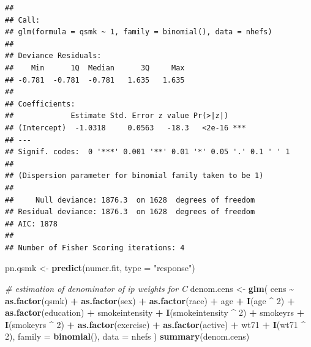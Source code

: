 \documentclass[
  10pt,
]{book}
\newenvironment{Shaded}{\begin{snugshade}}{\end{snugshade}}
\newcommand{\CommentTok}[1]{\textcolor[rgb]{0.56,0.35,0.01}{\textit{#1}}}
\newcommand{\DataTypeTok}[1]{\textcolor[rgb]{0.13,0.29,0.53}{#1}}
\newcommand{\DecValTok}[1]{\textcolor[rgb]{0.00,0.00,0.81}{#1}}
\newcommand{\KeywordTok}[1]{\textcolor[rgb]{0.13,0.29,0.53}{\textbf{#1}}}
\newcommand{\NormalTok}[1]{#1}
\newcommand{\OperatorTok}[1]{\textcolor[rgb]{0.81,0.36,0.00}{\textbf{#1}}}
\newcommand{\StringTok}[1]{\textcolor[rgb]{0.31,0.60,0.02}{#1}}
\begin{document}
\begin{verbatim}
## 
## Call:
## glm(formula = qsmk ~ 1, family = binomial(), data = nhefs)
## 
## Deviance Residuals: 
##    Min      1Q  Median      3Q     Max  
## -0.781  -0.781  -0.781   1.635   1.635  
## 
## Coefficients:
##             Estimate Std. Error z value Pr(>|z|)    
## (Intercept)  -1.0318     0.0563   -18.3   <2e-16 ***
## ---
## Signif. codes:  0 '***' 0.001 '**' 0.01 '*' 0.05 '.' 0.1 ' ' 1
## 
## (Dispersion parameter for binomial family taken to be 1)
## 
##     Null deviance: 1876.3  on 1628  degrees of freedom
## Residual deviance: 1876.3  on 1628  degrees of freedom
## AIC: 1878
## 
## Number of Fisher Scoring iterations: 4
\end{verbatim}

\begin{Shaded}
\begin{Highlighting}[]
\NormalTok{pn.qsmk \textless{}{-}}\StringTok{ }\KeywordTok{predict}\NormalTok{(numer.fit, }\DataTypeTok{type =} \StringTok{"response"}\NormalTok{)}

\CommentTok{\# estimation of denominator of ip weights for C}
\NormalTok{denom.cens \textless{}{-}}\StringTok{ }\KeywordTok{glm}\NormalTok{(}
\NormalTok{  cens }\OperatorTok{\textasciitilde{}}\StringTok{ }\KeywordTok{as.factor}\NormalTok{(qsmk) }\OperatorTok{+}\StringTok{ }\KeywordTok{as.factor}\NormalTok{(sex) }\OperatorTok{+}
\StringTok{    }\KeywordTok{as.factor}\NormalTok{(race) }\OperatorTok{+}\StringTok{ }\NormalTok{age }\OperatorTok{+}\StringTok{ }\KeywordTok{I}\NormalTok{(age }\OperatorTok{\^{}}\StringTok{ }\DecValTok{2}\NormalTok{) }\OperatorTok{+}
\StringTok{    }\KeywordTok{as.factor}\NormalTok{(education) }\OperatorTok{+}\StringTok{ }\NormalTok{smokeintensity }\OperatorTok{+}
\StringTok{    }\KeywordTok{I}\NormalTok{(smokeintensity }\OperatorTok{\^{}}\StringTok{ }\DecValTok{2}\NormalTok{) }\OperatorTok{+}\StringTok{ }\NormalTok{smokeyrs }\OperatorTok{+}\StringTok{ }\KeywordTok{I}\NormalTok{(smokeyrs }\OperatorTok{\^{}}\StringTok{ }\DecValTok{2}\NormalTok{) }\OperatorTok{+}
\StringTok{    }\KeywordTok{as.factor}\NormalTok{(exercise) }\OperatorTok{+}\StringTok{ }\KeywordTok{as.factor}\NormalTok{(active) }\OperatorTok{+}\StringTok{ }\NormalTok{wt71 }\OperatorTok{+}\StringTok{ }\KeywordTok{I}\NormalTok{(wt71 }\OperatorTok{\^{}}\StringTok{ }\DecValTok{2}\NormalTok{),}
  \DataTypeTok{family =} \KeywordTok{binomial}\NormalTok{(),}
  \DataTypeTok{data =}\NormalTok{ nhefs}
\NormalTok{)}
\KeywordTok{summary}\NormalTok{(denom.cens)}
\end{Highlighting}
\end{Shaded}
\end{document}
